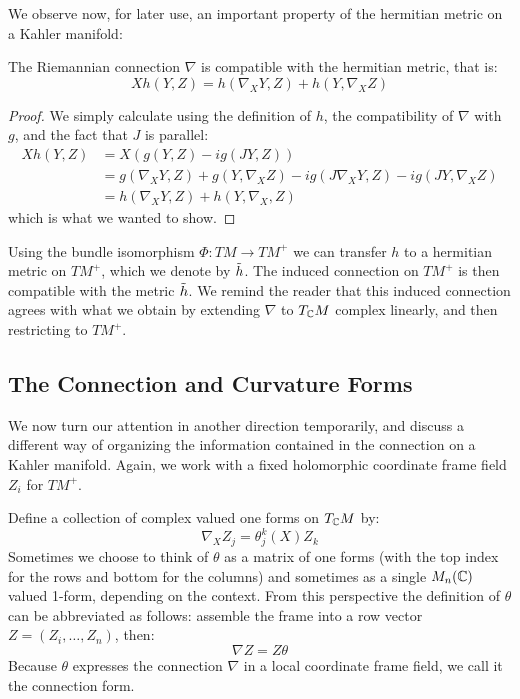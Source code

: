  We observe now, for later use, an important property of the hermitian metric on a Kahler manifold:
%
\begin{prop} The Riemannian connection $\nabla$ is compatible with the hermitian metric, that is:
%
$$ X h( Y,Z ) = h( \nabla_X Y, Z ) + h( Y, \nabla_X Z ) $$
%
\end{prop}
%
\begin{proof}
We simply calculate using the definition of $h$, the compatibility of $\nabla$ with $g$, and the fact that $J$ is parallel:
%
\begin{align*}
X h(Y,Z) &= X( g(Y,Z) - i g( JY, Z ) ) \\
&= g( \nabla_X Y, Z ) + g( Y, \nabla_X Z ) - i g( J \nabla_X Y, Z ) - i g( JY, \nabla_X Z ) \\
&= h( \nabla_X Y, Z ) + h( Y, \nabla_X, Z)
\end{align*}
%
which is what we wanted to show.
%
\end{proof}
%
\begin{remark} Using the bundle isomorphism $\Phi : TM \rightarrow TM^{+}$ we can transfer $h$ to a hermitian metric on $TM^{+}$, which we denote by $\tilde{h}$. The induced connection on $TM^{+}$ is then compatible with the metric $\tilde{h}$.  We remind the reader that this induced connection agrees with what we obtain by extending $\nabla$ to $T_{\mathbb{C}}M$ complex linearly, and then restricting to $TM^{+}$.
\end{remark}

\subsection{The Connection and Curvature Forms}

We now turn our attention in another direction temporarily, and discuss a different way of organizing the information contained in the connection on a Kahler manifold.  Again, we work with a fixed holomorphic coordinate frame field $Z_i$ for $TM^{+}$. 

 Define a collection of complex valued one forms on $T_{\mathbb{C}}M$ by:
%
$$ \nabla_{X} Z_j = \theta^k_j (X) Z_k $$
%
Sometimes we choose to think of $\theta$ as a matrix of one forms (with the top index for the rows and bottom for the columns) and sometimes as a single $M_n(\mathbb{C})$ valued 1-form, depending on the context.  From this perspective the definition of $\theta$ can be abbreviated as follows: assemble the frame into a row vector $Z = (Z_i, \ldots, Z_n)$, then:
%
$$ \nabla Z = Z \theta $$
%
Because $\theta$ expresses the connection $\nabla$ in a local coordinate frame field, we call it the connection form.

